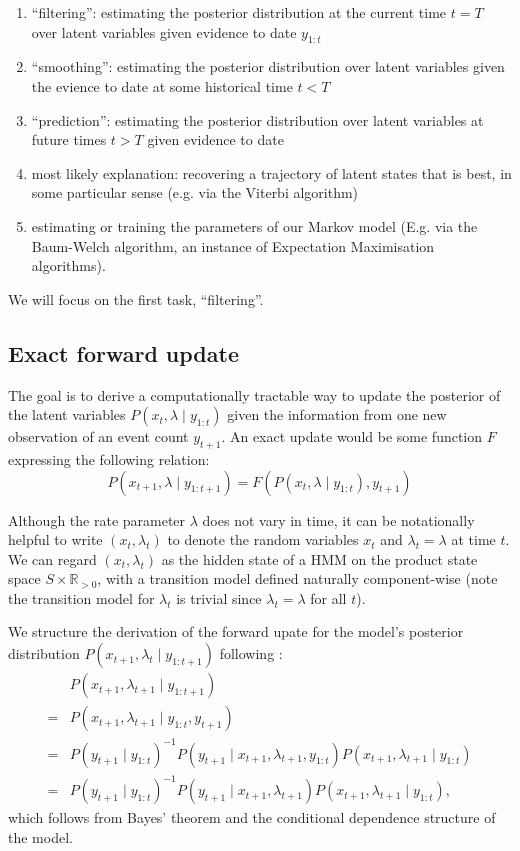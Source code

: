 \documentclass[twoside, 11pt]{article}
\newcommand{\reals}[0] {\mathbb{R}}
\begin{document}
\begin{enumerate}
\item ``filtering'': estimating the posterior distribution at the current time $t=T$ over latent variables given evidence to date $y_{1:t}$
\item ``smoothing'': estimating the posterior distribution over latent variables given the evience to date at some historical time $t<T$
\item ``prediction'': estimating the posterior distribution over latent variables at future times $t>T$ given evidence to date
\item most likely explanation: recovering a trajectory of latent states that is best, in some particular sense (e.g. via the Viterbi algorithm)
\item estimating or training the parameters of our Markov model (E.g. via the Baum-Welch algorithm, an instance of Expectation Maximisation algorithms).
\end{enumerate}

We will focus on the first task, ``filtering''.

\subsection{Exact forward update}

The goal is to derive a computationally tractable way to update the posterior of the latent variables $P(x_t, \lambda \mid y_{1:t})$ given the information from one new observation of an event count $y_{t+1}$. An exact update would be some function $F$ expressing the following relation:
\begin{equation}
P(x_{t+1}, \lambda \mid y_{1:t+1}) = F\left( P(x_t, \lambda \mid y_{1:t}), y_{t+1}\right)
\end{equation}

Although the rate parameter $\lambda$ does not vary in time, it can be notationally helpful to write $(x_t, \lambda_t)$ to denote the random variables $x_t$ and $\lambda_t=\lambda$ at time $t$. We can regard $(x_t, \lambda_t)$ as the hidden state of a HMM on the product state space $S \times \reals_{>0}$, with a transition model defined naturally component-wise (note the transition model for $\lambda_t$ is trivial since $\lambda_t=\lambda$ for all $t$).

We structure the derivation of the forward upate for the model's posterior distribution $P(x_{t+1}, \lambda_t \mid y_{1:{t+1}})$ following \citet*{russell2002artificial}:
\begin{align}
& P(x_{t+1}, \lambda_{t+1} \mid y_{1:{t+1}}) \nonumber \\
= & P(x_{t+1}, \lambda_{t+1} \mid y_{1:t}, y_{t+1}) \nonumber \\
= & P(y_{t+1} \mid y_{1:t})^{-1} P(y_{t+1} \mid x_{t+1}, \lambda_{t+1}, y_{1:t}) P(x_{t+1}, \lambda_{t+1} \mid y_{1:t}) \nonumber \\
= & P(y_{t+1} \mid y_{1:t})^{-1} P(y_{t+1} \mid x_{t+1}, \lambda_{t+1}) P(x_{t+1}, \lambda_{t+1} \mid y_{1:t}) , \label{eqn:rawforward}
\end{align}
which follows from Bayes' theorem and the conditional dependence structure of the model.
\end{document}
